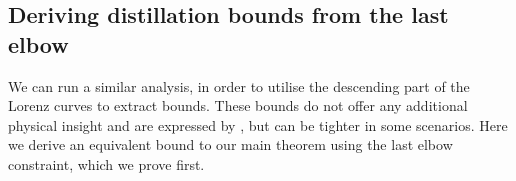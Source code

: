 \documentclass[pra,
aps,
twocolumn,
superscriptaddress,
groupedaddress,
nofootinbib,
reprint
]{revtex4-1}
\begin{document}
	
\subsection{Deriving distillation bounds from the last elbow}
\label{sec:last_elb}


We can run a similar analysis, in order to utilise the descending part of the Lorenz curves to extract bounds.
These bounds do not offer any additional physical insight and are expressed by , but can be tighter in some scenarios.
Here we derive an equivalent bound to our main theorem using the last elbow constraint, which we prove first.
\end{document}
